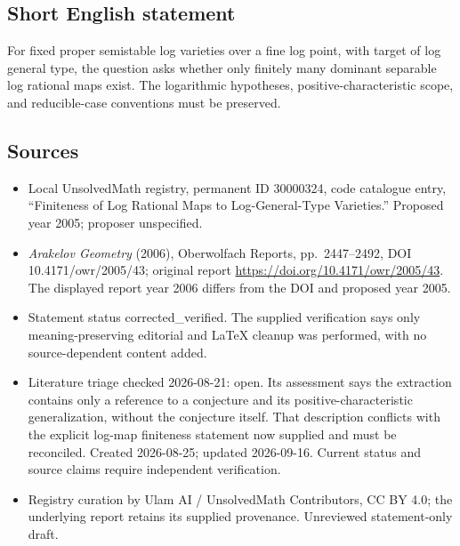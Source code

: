 \documentclass[11pt]{article}
\begin{document}
\subsection{Short English statement}
For fixed proper semistable log varieties over a fine log point, with target of log general type, the question asks whether only finitely many dominant separable log rational maps exist. The logarithmic hypotheses, positive-characteristic scope, and reducible-case conventions must be preserved.
\subsection{Sources}
\begin{itemize}
\item Local UnsolvedMath registry, permanent ID 30000324, code catalogue entry, ``Finiteness of Log Rational Maps to Log-General-Type Varieties.'' Proposed year 2005; proposer unspecified.
\item \emph{Arakelov Geometry} (2006), Oberwolfach Reports, pp.\ 2447--2492, DOI 10.4171/owr/2005/43; original report \url{https://doi.org/10.4171/owr/2005/43}. The displayed report year 2006 differs from the DOI and proposed year 2005.
\item Statement status corrected\_verified. The supplied verification says only meaning-preserving editorial and LaTeX cleanup was performed, with no source-dependent content added.
\item Literature triage checked 2026-08-21: open. Its assessment says the extraction contains only a reference to a conjecture and its positive-characteristic generalization, without the conjecture itself. That description conflicts with the explicit log-map finiteness statement now supplied and must be reconciled. Created 2026-08-25; updated 2026-09-16. Current status and source claims require independent verification.
\item Registry curation by Ulam AI / UnsolvedMath Contributors, CC BY 4.0; the underlying report retains its supplied provenance. Unreviewed statement-only draft.
\end{itemize}
\end{document}
